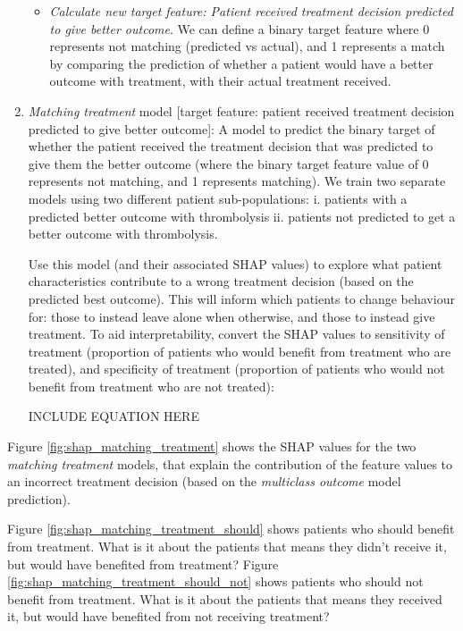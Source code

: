 \begin{enumerate}
    \begin{itemize}
        \item \textit{Calculate new target feature: Patient received treatment decision predicted to give better outcome}. We can define a binary target feature where 0 represents not matching (predicted vs actual), and 1 represents a match by comparing the prediction of whether a patient would have a better outcome with treatment, with their actual treatment received.
    \end{itemize}
    
    \item \textit{Matching treatment} model [target feature: patient received treatment decision predicted to give better outcome]: A model to predict the binary target of whether the patient received the treatment decision that was predicted to give them the better outcome (where the binary target feature value of 0 represents not matching, and 1 represents matching). We train two separate models using two different patient sub-populations: i. patients with a predicted better outcome with thrombolysis ii. patients not predicted to get a better outcome with thrombolysis. 
    
    Use this model (and their associated SHAP values) to explore what patient characteristics contribute to a wrong treatment decision (based on the predicted best outcome). This will inform which patients to change behaviour for: those to instead leave alone when otherwise, and those to instead give treatment. To aid interpretability, convert the SHAP values to sensitivity of treatment (proportion of patients who would benefit from treatment who are treated), and specificity of treatment (proportion of patients who would not benefit from treatment who are not treated):

        INCLUDE EQUATION HERE
    
\end{enumerate}



\iffalse

Figure \ref{fig:shap_matching_treatment} shows the SHAP values for the two \textit{matching treatment} models, that explain the contribution of the feature values to an incorrect treatment decision (based on the \textit{multiclass outcome} model prediction).

Figure \ref{fig:shap_matching_treatment_should} shows patients who should benefit from treatment. What is it about the patients that means they didn't receive it, but would have benefited from treatment?
Figure \ref{fig:shap_matching_treatment_should_not} shows patients who should not benefit from treatment. What is it about the patients that means they received it, but would have benefited from not receiving treatment?

